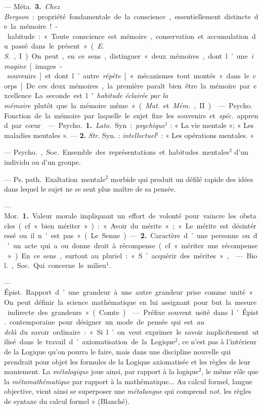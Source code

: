 \begin{itemize}[leftmargin=1cm, label=, itemsep=1pt]
— \si{Méta.} {\bf 3.} {\it Chez Bergson} : propriété fondamentale de la
conscience, essentiellement distincte de la mémoire!-habitude : « Toute
conscience est mémoire, conservation et accumulation du passé dans le
présent » ({\it E. S.}, I). On peut, en ce sens, distinguer « deux mémoires,
dont l’une {\it imagine} [images-souvenirs] et dont l’autre {\it répète}
[« mécanismes tout montés » dans le corps]... De ces deux mémoires, la
première paraît bien être la mémoire par excellence. La seconde. est
l'{\it habitude éclairée par la mémoire} plutôt que la mémoire même »
({\it Mat.} et {\it Mém.}, II).

 — \si{Psycho.} Fonction de la mémoire par
laquelle le sujet fixe les souvenirs et {\it spéc.} apprend par cœur.

 — \si{Psycho.} {\bf 1.} {\it Lato.} Syn. : {\it psychique}$^1$ :
« La vie mentale »; « Les maladies mentales ». — {\bf 2.} {\it Str.} Syn. :
{\it intellectuel}$^1$ : « Les opérations mentales. »

 — \si{Psycho.}, \si{Soc.} Ensemble des représentations et
habitudes mentales$^2$ d’un individu ou d’un groupe.

 — \si{Ps. path.} Exaltation mentale$^2$ morbide qui produit un
défilé rapide des idées dans lequel le sujet ne se sent plus maître de sa
pensée.

 — \si{Mor.} {\bf 1.} Valeur morale impliquant un effort de
volonté pour vaincre les obstacles (cf. « bien mériter ») : « Avoir du
mérite » ; « Le mérite est désintéressé ou il n'est pas » (Le Senne). —
{\bf 2.} Caractère d’une personne ou d’un acte qui a ou donne droit à
récompense (cf. « mériter une récompense »). En ce sens, surtout au pluriel :
« S’acquérir des mérites »,

 — \si{Biol.}, \si{Soc.} Qui concerne le milieu$^1$.

 — \si{Épist.} Rapport d’une grandeur à une autre grandeur prise
comme unité « On peut définir la science mathématique en lui assignant pour
but la mesure indirecte des grandeurs » (Comte).

 — Préfixe souvent usité dans l'\si{Épist.} contemporaine pour
désigner un mode de pensée qui est {\it au delà} du savoir ordinaire : « Si
l’on veut exprimer le savoir implicitement utilisé dans le travail
d’axiomatisation de la Logique$^2$, ce n’est pas à l’intérieur de la Logique
qu’on pourra le faire, mais dans une discipline nouvelle qui prendrait pour
objet les formules de la Logique axiomatisée et les règles de leur maniement.
La {\it métalogique} joue ainsi, par rapport à la logique$^2$, le même rôle
que la {\it métamathématique} par rapport à la mathématique... Au calcul
formel, langue objective, vient ainsi se superposer une {\it métalangue} qui
comprend {\it not.} les règles de syntaxe du calcul formel » (Blanché).


\end{itemize}
